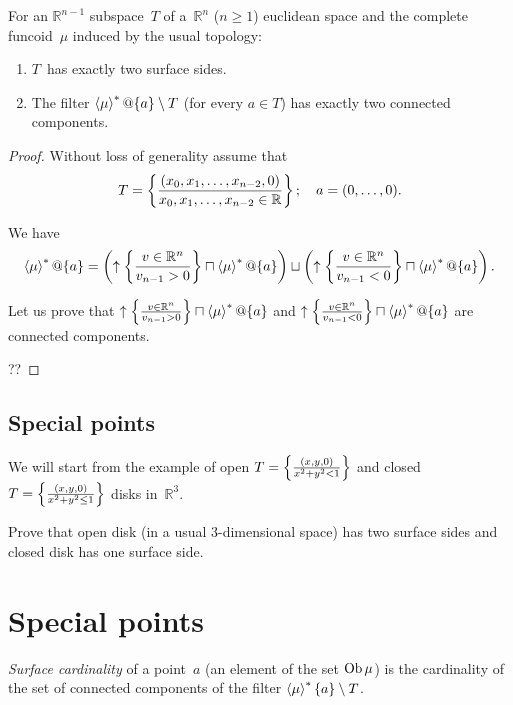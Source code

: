 \begin{example}
For an $\mathbb{R}^{n-1}$ subspace~$T$ of a~$\mathbb{R}^n$ ($n\geq 1$)
euclidean space and the complete funcoid~$\mu$ induced by the usual topology:
\begin{enumerate}
\item $T$~has exactly two surface sides.
\item The filter $\left\langle \mu\right\rangle ^{\ast}@\{a\} \setminus T$ (for every $a\in T$)
  has exactly two connected components.
\end{enumerate}
\end{example}

\begin{proof}
Without loss of generality assume that
\[ T=\left\{ \frac{(x_0,x_1,\dots,x_{n-2},0)}{
x_0,x_1,\dots,x_{n-2}\in\mathbb{R}}\right\};
\quad
a = (0,\dots,0). \]

We have
\[ \left\langle \mu\right\rangle ^{\ast}@\{a\} =
\left(\uparrow\left\{ \frac{v\in\mathbb{R}^n}{v_{n-1}>0}\right\}\sqcap\left\langle \mu\right\rangle ^{\ast}@\{a\}\right)
\sqcup
\left(\uparrow\left\{ \frac{v\in\mathbb{R}^n}{v_{n-1}<0}\right\}\sqcap\left\langle \mu\right\rangle ^{\ast}@\{a\}\right). \]

Let us prove that
$\uparrow\left\{ \frac{v\in\mathbb{R}^n}{v_{n-1}>0}\right\}\sqcap\left\langle \mu\right\rangle ^{\ast}@\{a\}$ and
$\uparrow\left\{ \frac{v\in\mathbb{R}^n}{v_{n-1}<0}\right\}\sqcap\left\langle \mu\right\rangle ^{\ast}@\{a\}$ are
connected components.

??
\end{proof}

\subsection{Special points}

We will start from the example of open $T=\left\{ \frac{(x,y,0)}{x^2+y^2<1}\right\}$
and closed $T=\left\{ \frac{(x,y,0)}{x^2+y^2\leq 1}\right\}$ disks in~$\mathbb{R}^3$.

\begin{xca}
Prove that open disk (in a usual 3-dimensional space) has two surface sides
and closed disk has one surface side.
\end{xca}

\section{Special points}

\begin{defn}
\emph{Surface cardinality} of a point~$a$ (an element of the set $\operatorname{Ob}\mu$) is
the cardinality of the set of connected components of the filter
$\left\langle \mu\right\rangle ^{\ast}\{a\}\setminus T$.
\end{defn}

